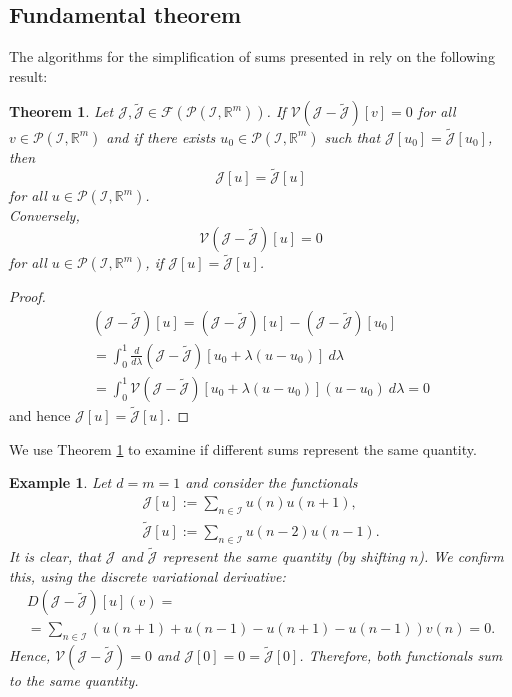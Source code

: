 \documentclass[sigconf,twocolumn]{acmart}
\newcommand{\Rr}{{\mathbb{R}}}
\newcommand{\1}{{\chi}}
\newcommand{\Ii}{{\mathcal{I}}}
\numberwithin{equation}{section}
\theoremstyle{thmlemcorr}
\numberwithin{theorem}{section}
\theoremstyle{thmlemcorr*}
\theoremstyle{defi}
\theoremstyle{remexample}
\newtheorem{example}[theorem]{Example}
\newtheorem{teo}[theorem]{Theorem}
\theoremstyle{ass}
\begin{document}
\subsection*{Fundamental theorem}
The algorithms for the simplification of sums presented in \cite{gomes20} rely on the following result:
\begin{teo}\label{theo1}
	Let $\mathcal{J},\tilde{\mathcal{J}}\in \mathcal{F}(\mathcal{P}(\Ii,\Rr^m))$. If $\mathcal{V}(\mathcal{J}-\tilde{\mathcal{J}})[v]=0$ for all $v\in\mathcal{P}(\Ii,\Rr^m)$ and if there exists $u_0\in\mathcal{P}(\Ii,\Rr^m)$ such that $\mathcal{J}[u_0]=\tilde{\mathcal{J}}[u_0]$, then
	\begin{equation*}
		\mathcal{J}[u]=\tilde{\mathcal{J}}[u]
	\end{equation*}
	for all $u\in\mathcal{P}(\Ii,\Rr^m)$.\\
	Conversely,
	\begin{equation*}
		 \mathcal{V}(\mathcal{J}-\tilde{\mathcal{J}})[u]=0
	\end{equation*}
	for all $u\in\mathcal{P}(\Ii,\Rr^m)$, if $\mathcal{J}[u]=\tilde{\mathcal{J}}[u]$.
\end{teo}
\begin{proof}
	\begin{gather*}
		(\mathcal{J}-\tilde{\mathcal{J}})[u]=(\mathcal{J}-\tilde{\mathcal{J}})[u]-(\mathcal{J}-\tilde{\mathcal{J}})[u_0]\\
		=\int_{0}^{1}\frac{d}{d\lambda}(\mathcal{J}-\tilde{\mathcal{J}})[u_0+\lambda(u-u_0)]\ d\lambda\\
		=\int_{0}^{1}\mathcal{V}(\mathcal{J}-\tilde{\mathcal{J}})[u_0+\lambda(u-u_0)](u-u_0)\ d\lambda=0
	\end{gather*}
	and hence $\mathcal{J}[u]=\tilde{\mathcal{J}}[u]$.
\end{proof}
We use Theorem \ref{theo1} to examine if different sums represent the same quantity.
\begin{example}
	Let $d=m=1$ and consider the functionals
	\begin{gather*}
		\mathcal{J}[u]:=\sum_{n\in\Ii}u(n)u(n+1),\\
		\tilde{\mathcal{J}}[u]:=\sum_{n\in\Ii}u(n-2)u(n-1).
	\end{gather*}
	It is clear, that $\mathcal{J}$ and $\tilde{\mathcal{J}}$ represent the same quantity (by shifting $n$). We confirm this, using the discrete variational derivative:
	\begin{gather*}
		D(\mathcal{J}-\tilde{\mathcal{J}})[u](v)=\\
		=\sum_{n\in\Ii}(u(n+1)+u(n-1)-u(n+1)-u(n-1))v(n)=0.
	\end{gather*}
	Hence, $\mathcal{V}(\mathcal{J}-\tilde{\mathcal{J}})=0$ and $\mathcal{J}[0]=0=\tilde{\mathcal{J}}[0]$. Therefore, both functionals sum to the same quantity.
\end{example}
\end{document}
